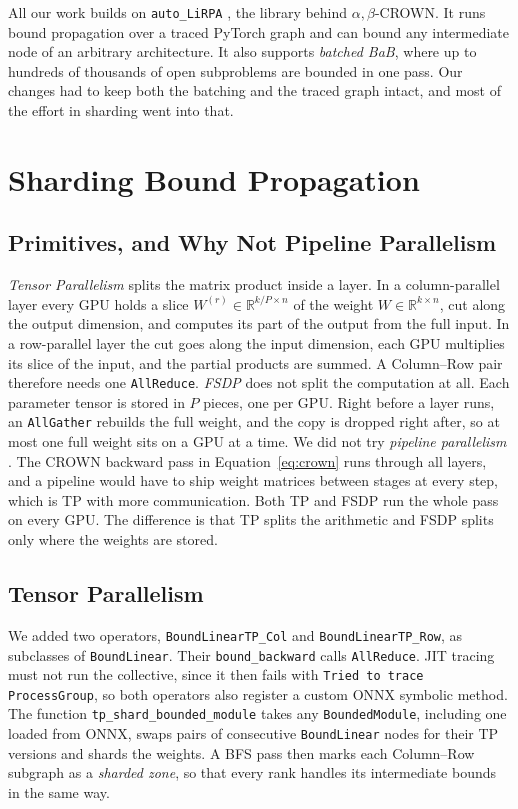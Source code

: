 \documentclass[runningheads]{llncs}
\begin{document}
All our work builds on \texttt{auto\_LiRPA} \cite{AutoLiRPARepo}, the library
behind $\alpha,\beta$-CROWN. It runs bound propagation over a traced PyTorch
graph and can bound any intermediate node of an arbitrary architecture. It also
supports \emph{batched BaB}, where up to hundreds of thousands of open
subproblems are bounded in one pass. Our changes had to keep both the batching
and the traced graph intact, and most of the effort in sharding went into that.

\section{Sharding Bound Propagation}
\label{sec:method}

\subsection{Primitives, and Why Not Pipeline Parallelism}
\label{sec:primitives}

\emph{Tensor Parallelism} \cite{MegatronLM2020} splits the matrix product
inside a layer. In a column-parallel layer every GPU holds a slice
$W^{(r)} \in \mathbb{R}^{k/P \times n}$ of the weight $W \in \mathbb{R}^{k \times n}$,
cut along the output dimension, and computes its part of the output from the
full input. In a row-parallel layer the cut goes along the input dimension, each
GPU multiplies its slice of the input, and the partial products are summed. A
Column--Row pair therefore needs one \texttt{AllReduce}. \emph{FSDP}
\cite{ZeROPaper} does not split the computation at all. Each parameter tensor
is stored in $P$ pieces, one per GPU. Right before a layer runs, an
\texttt{AllGather} rebuilds the full weight, and the copy is dropped right
after, so at most one full weight sits on a GPU at a time. We did not try
\emph{pipeline parallelism} \cite{GPipePaper}. The CROWN backward pass in
Equation~\ref{eq:crown} runs through all layers, and a pipeline would have to
ship weight matrices between stages at every step, which is TP with more
communication. Both TP and FSDP run the whole pass on every GPU. The difference
is that TP splits the arithmetic and FSDP splits only where the weights are
stored.

\subsection{Tensor Parallelism}
\label{sec:tp}

We added two operators, \texttt{BoundLinearTP\_Col} and
\texttt{BoundLinearTP\_Row}, as subclasses of \texttt{BoundLinear}. Their
\texttt{bound\_backward} calls \texttt{AllReduce}. JIT tracing must not run the
collective, since it then fails with \texttt{Tried to trace ProcessGroup}, so
both operators also register a custom ONNX symbolic method. The function
\texttt{tp\_shard\_bounded\_module} takes any \texttt{BoundedModule}, including
one loaded from ONNX, swaps pairs of consecutive \texttt{BoundLinear} nodes for
their TP versions and shards the weights. A BFS pass then marks each Column--Row
subgraph as a \emph{sharded zone}, so that every rank handles its intermediate
bounds in the same way.
\end{document}
